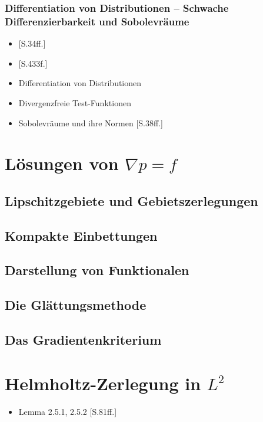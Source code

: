 \subsection{Differentiation von Distributionen -- Schwache Differenzierbarkeit und Sobolevräume}

\begin{itemize}
  \item \cite{sohr2001navier}[S.34ff.]
  \item \cite{werner2011fa}[S.433f.]
  \item Differentiation von Distributionen
  \item Divergenzfreie Test-Funktionen
  \item Sobolevräume und ihre Normen \cite{sohr2001navier}[S.38ff.]
\end{itemize}

\chapter{Lösungen von $\nabla p = f$}
\section{Lipschitzgebiete und Gebietszerlegungen}
\section{Kompakte Einbettungen}
\section{Darstellung von Funktionalen}
\section{Die Glättungsmethode}
\section{Das Gradientenkriterium}

\chapter{Helmholtz-Zerlegung in $L^2$}

\begin{itemize}
  \item Lemma 2.5.1, 2.5.2 \cite{sohr2001navier}[S.81ff.]
\end{itemize}


